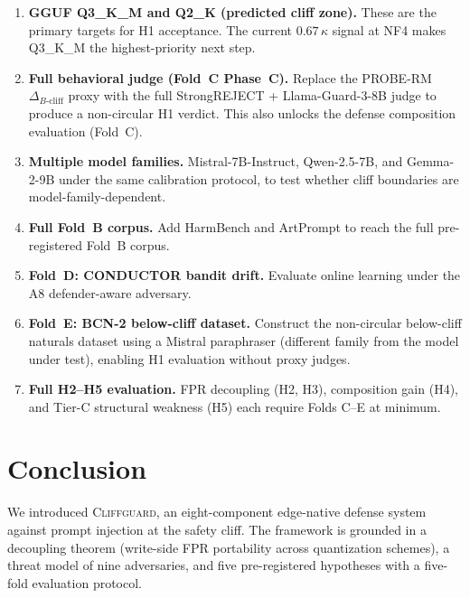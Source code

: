 \documentclass[11pt,a4paper]{article}
\newcommand{\bcliff}{\Delta_{B\text{-cliff}}}
\newcommand{\kap}{\kappa}
\newcommand{\CG}{\textsc{Cliffguard}}
\begin{document}
\begin{enumerate}[label=\arabic*., leftmargin=2em, itemsep=4pt]

  \item \textbf{GGUF Q3\_K\_M and Q2\_K (predicted cliff zone).}
        These are the primary targets for H1 acceptance.
        The current $0.67\,\kap$ signal at NF4 makes Q3\_K\_M the highest-priority
        next step.

  \item \textbf{Full behavioral judge (Fold~C Phase~C).}
        Replace the PROBE-RM $\bcliff$ proxy with the full StrongREJECT +
        Llama-Guard-3-8B judge to produce a non-circular H1 verdict.
        This also unlocks the defense composition evaluation (Fold~C).

  \item \textbf{Multiple model families.}
        Mistral-7B-Instruct, Qwen-2.5-7B, and Gemma-2-9B under the same
        calibration protocol, to test whether cliff boundaries are
        model-family-dependent.

  \item \textbf{Full Fold~B corpus.}
        Add HarmBench \citep{mazeika2024harmbench} and ArtPrompt to reach the
        full pre-registered Fold~B corpus.

  \item \textbf{Fold~D: CONDUCTOR bandit drift.}
        Evaluate online learning under the A8 defender-aware adversary.

  \item \textbf{Fold~E: BCN-2 below-cliff dataset.}
        Construct the non-circular below-cliff naturals dataset using a Mistral
        paraphraser (different family from the model under test), enabling
        H1 evaluation without proxy judges.

  \item \textbf{Full H2--H5 evaluation.}
        FPR decoupling (H2, H3), composition gain (H4), and Tier-C structural
        weakness (H5) each require Folds C--E at minimum.

\end{enumerate}

\section{Conclusion}
\label{sec:conclusion}

We introduced \CG{}, an eight-component edge-native defense system against
prompt injection at the safety cliff.
The framework is grounded in a decoupling theorem (write-side FPR portability
across quantization schemes), a threat model of nine adversaries, and five
pre-registered hypotheses with a five-fold evaluation protocol.
\end{document}
